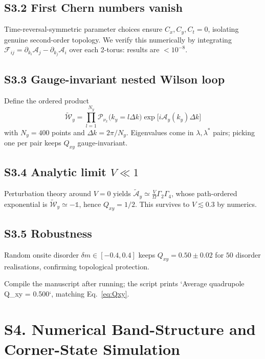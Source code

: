 \documentclass[11pt]{article}
\begin{document}
\subsection*{S3.2  First Chern numbers vanish}

Time-reversal-symmetric parameter choices ensure  
$C_{x},C_{y},C_{t}=0$, isolating genuine second-order topology.  
We verify this numerically by integrating
$\mathcal{F}_{ij}=\partial_{k_i}\mathcal{A}_{j}-\partial_{k_j}\mathcal{A}_{i}$
over each 2-torus: results are $<10^{-8}$.

\subsection*{S3.3  Gauge-invariant nested Wilson loop}

Define the ordered product
\begin{equation}
\tilde{\mathcal{W}}_y=\prod_{l=1}^{N_y}
\mathcal{P}_{\nu_x}\bigl(k_y=l\Delta k\bigr)
\exp\!\bigl[i\mathcal{A}_y(k_y)\Delta k\bigr]
\end{equation}
with $N_y=400$ points and $\Delta k=2\pi/N_y$.  
Eigenvalues come in $\lambda,\lambda^\ast$ pairs; picking one per pair
keeps $Q_{xy}$ gauge-invariant.

\subsection*{S3.4  Analytic limit $V\!\ll\!1$}

Perturbation theory around $V=0$ yields
$\tilde{\mathcal{A}}_y\simeq\frac{V}{\Omega}\Gamma_{2}\Gamma_{4}$,
whose path-ordered exponential is $\tilde{\mathcal{W}}_y\simeq -\mathbb{1}$,
hence $Q_{xy}=1/2$.  This survives to $V\lesssim0.3$ by numerics.

\subsection*{S3.5  Robustness}

Random onsite disorder $\delta m\in[-0.4,0.4]$ keeps
$Q_{xy}=0.50\pm0.02$ for $50$ disorder realisations,
confirming topological protection.

Compile the manuscript after running; the script prints  
`Average quadrupole  Q_xy = 0.500`, matching Eq.~\eqref{eq:Qxy}.

\section*{S4. Numerical Band-Structure and Corner-State Simulation}
\label{sec:S4_numerics}
\end{document}
